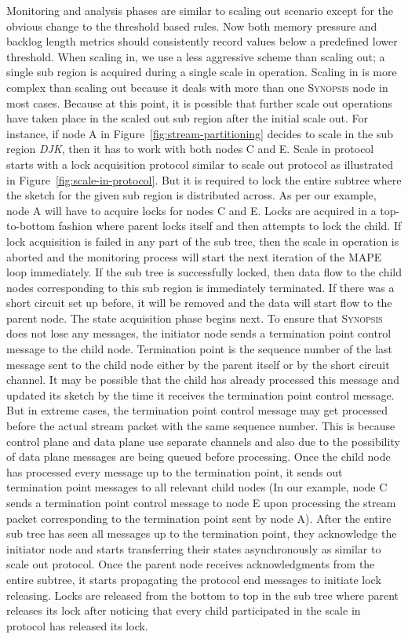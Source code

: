 Monitoring and analysis phases are similar to scaling out scenario except for the obvious change to the threshold based rules.
Now both memory pressure and backlog length metrics should consistently record values below a predefined lower threshold.
When scaling in, we use a less aggressive scheme than scaling out; a single sub region is acquired during a single scale in operation.
Scaling in is more complex than scaling out because it deals with more than one \textsc{Synopsis} node in most cases.
Because at this point, it is possible that further scale out operations have taken place in the scaled out sub region after the initial scale out.
For instance, if node A in Figure~\ref{fig:stream-partitioning} decides to scale in the sub region \emph{DJK}, then it has to work with both nodes C and E.
Scale in protocol starts with a lock acquisition protocol similar to scale out protocol as illustrated in Figure~\ref{fig:scale-in-protocol}.
But it is required to lock the entire subtree where the sketch for the given sub region is distributed across.
As per our example, node A will have to acquire locks for nodes C and E.
Locks are acquired in a top-to-bottom fashion where parent locks itself and then attempts to lock the child.
If lock acquisition is failed in any part of the sub tree, then the scale in operation is aborted and the monitoring process will start the next iteration of the MAPE loop immediately.
If the sub tree is successfully locked, then data flow to the child nodes corresponding to this sub region is immediately terminated.
If there was a short circuit set up before, it will be removed and the data will start flow to the parent node.
The state acquisition phase begins next.
To ensure that \textsc{Synopsis} does not lose any messages, the initiator node sends a termination point control message to the child node.
Termination point is the sequence number of the last message sent to the child node either by the parent itself or by the short circuit channel.
It may be possible that the child has already processed this message and updated its sketch by the time it receives the termination point control message.
But in extreme cases, the termination point control message may get processed before the actual stream packet with the same sequence number.
This is because control plane and data plane use separate channels and also due to the possibility of data plane messages are being queued before processing.
Once the child node has processed every message up to the termination point, it sends out termination point messages to all relevant child nodes (In our example, node C sends a termination point control message to node E upon processing the stream packet corresponding to the termination point sent by node A).
After the entire sub tree has seen all messages up to the termination point, they acknowledge the initiator node and starts transferring their states asynchronously as similar to scale out protocol.
Once the parent node receives acknowledgments from the entire subtree, it starts propagating the protocol end messages to initiate lock releasing.
Locks are released from the bottom to top in the sub tree where parent releases its lock after noticing that every child participated in the scale in protocol has released its lock.

